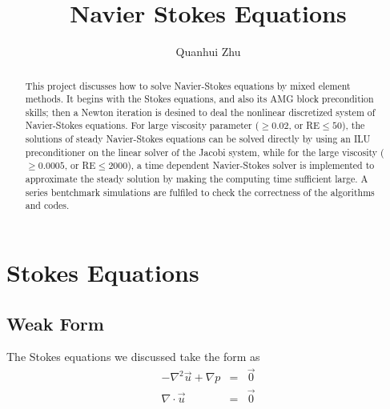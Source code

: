 \documentclass[a4paper]{article}
\title{Navier Stokes Equations}
\author{Quanhui Zhu}
\begin{document}
\maketitle

\begin{abstract}
This project discusses how to solve Navier-Stokes equations by mixed element methods. It begins with the Stokes equations, and also its AMG block precondition skills; then a Newton iteration is desined to deal the nonlinear discretized system of Navier-Stokes equations. For large viscosity parameter ($\geq 0.02$, or RE$\leq 50$), the solutions of steady Navier-Stokes equations can be solved directly by using an ILU preconditioner on the linear solver of the Jacobi system, while for the large viscosity ($\geq 0.0005$, or RE$\leq 2000$), a time dependent Navier-Stokes solver is implemented to approximate the steady solution by making the computing time sufficient large. A series bentchmark simulations are fulfiled to check the correctness of the algorithms and codes.
\end{abstract}


\section{Stokes Equations}

\subsection{Weak Form}

The Stokes equations we discussed take the form as
\begin{equation}
\begin{array}{rcl}
-\nabla^2 \vec{u} + \nabla p &=& \vec{0} \\
\nabla \cdot \vec{u} &=& \vec{0}
\label{eq::Stokes-problem}
\end{array}
\end{equation}
\end{document}
